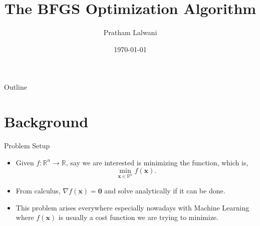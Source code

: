 \documentclass{beamer}
\title{The BFGS Optimization Algorithm}
\author{Pratham Lalwani}
\institute{UC Merced}
\date{\today}
\begin{document}
\frame{\titlepage}

\begin{frame}{Outline}
	\tableofcontents
\end{frame}

\section{Background}
\begin{frame}{Problem Setup}
	\begin{itemize}
		\item Given $f:\mathbb{R}^n \to \mathbb{R}$, say we are interested is minimizing the function, which is,
		      \[
			      \min_{\bm x\in \mathbb{R}^n} f(\bm x)
			      .\]
		\item From calculus, $\nabla f(\bm x) = \bm 0$ and solve analytically if it can be done.
		\item This problem arises everywhere especially nowadays with Machine Learning where $f(\bm x)$ is usually a cost function we are trying to minimize.
	\end{itemize}
\end{frame}
\end{document}
